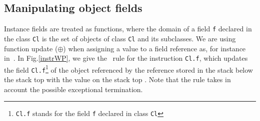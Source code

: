 \subsection{Manipulating object fields}
Instance fields are treated as functions, where the domain of a field \texttt{f} 
declared in the class \texttt{Cl} is the set of objects of class \texttt{Cl} and its subclasses.
We are using function update ($\oplus$) when assigning a value to a field reference as, for instance in~\cite{B00ppp}. In Fig.\ref{instrWP}, we give the \wpi \ rule for the
instruction  \texttt{Cl.f}, which updates the field \texttt{Cl.f}\footnote{ \texttt{Cl.f} stands for the field \texttt{f} declared in class 
\texttt{Cl}} of the object referenced by the reference stored in the stack below the stack top  with the value on the stack top \stack{\counter}.
 Note that the rule takes in account the possible exceptional termination.





